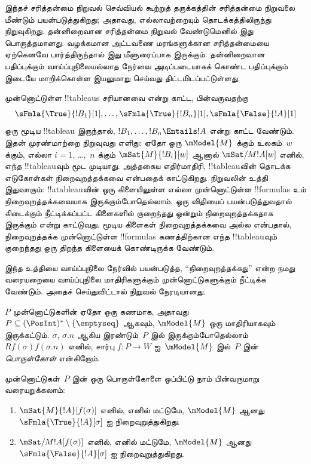 \documentclass[../../../include/open-logic-section]{subfiles}
\begin{document}


\begin{editorial}
  இந்தச் சரித்தன்மை நிறுவல் செவ்வியல் கூற்றுத் தருக்கத்தின் சரித்தன்மை
  நிறுவலை மீண்டும் பயன்படுத்துகிறது; அதாவது, எல்லாவற்றையும் தொடக்கத்திலிருந்து
  நிறுவுகிறது. தன்னிறைவான சரித்தன்மை நிறுவல் வேண்டுமெனில் இது பொருத்தமானது.
  வழக்கமான அட்டவணை மரங்களுக்கான சரித்தன்மையை ஏற்கெனவே பார்த்திருந்தால் இது
  மீளுரைப்பாக இருக்கும். தன்னிறைவான பதிப்புக்கும் வாய்ப்புநிலையல்லாத நேர்வை
  அடிப்படையாகக் கொண்ட பதிப்புக்கும் இடையே மாறிக்கொள்ள இயலுமாறு செய்வது
  திட்டமிடப்பட்டுள்ளது.
\end{editorial}

\begin{explain}
  முன்னொட்டுள்ள !!{tableau}s சரியானவை என்று காட்ட, பின்வருவதற்கு
  \[
  \sFmla{\True}{!B_1}[1], \dots, \sFmla{\True}{!B_n}[1], \sFmla{\False}{!A}[1]
  \]
  ஒரு மூடிய !!{tableau} இருந்தால், $!B_1, \dots, !B_n \Entails !A$
  என்று காட்ட வேண்டும். இதன் முரண்மாற்றை நிறுவுவது எளிது: ஏதோ ஒரு
  $\mModel{M}$ க்கும் உலகம்~$w$ க்கும், எல்லா $i=1$, \dots,~$n$ க்கும்
  $\mSat{M}{!B_i}[w]$ ஆனால்
  $\mSat/{M}{!A}[w]$ எனில், எந்த !!{tableau}வும் மூட முடியாது. அத்தகைய
  எதிர்மாதிரி, !!{tableau}வின் தொடக்க எடுகோள்கள் நிறைவுறத்தக்கவை என்பதைக்
  காட்டுகிறது. நிறுவலின் உத்தி இதுவாகும்: !!a{tableau}வின் ஒரு கிளையிலுள்ள
  எல்லா முன்னொட்டுள்ள !!{formula}s உம் நிறைவுறத்தக்கவையாக இருக்கும்போதெல்லாம்,
  ஒரு விதியைப் பயன்படுத்துவதால் கிடைக்கும் நீட்டிக்கப்பட்ட கிளைகளில்
  குறைந்தது ஒன்றும் நிறைவுறத்தக்கதாக இருக்கும் என்று காட்டுவது. மூடிய கிளைகள்
  நிறைவுறத்தக்கவை அல்ல என்பதால், நிறைவுறத்தக்க முன்னொட்டுள்ள !!{formula}s
  கணத்திற்கான எந்த !!{tableau}வும் குறைந்தது ஒரு திறந்த கிளையைக் கொண்டிருக்க
  வேண்டும்.

  இந்த உத்தியை வாய்ப்புநிலை நேர்வில் பயன்படுத்த, ``நிறைவுறத்தக்கது'' என்ற
  நமது வரையறையை வாய்ப்புநிலை மாதிரிகளுக்கும் முன்னொட்டுகளுக்கும் நீட்டிக்க
  வேண்டும். அதைச் செய்துவிட்டால் நிறுவல் நேரடியானது.
\end{explain}

\begin{defn}
  $P$ முன்னொட்டுகளின் ஏதோ ஒரு கணமாக, அதாவது $P \subseteq (\PosInt)^*
  \setminus \{\emptyseq\}$ ஆகவும், $\mModel{M}$ ஒரு மாதிரியாகவும்
  இருக்கட்டும். $\sigma$, $\sigma.n$ ஆகிய இரண்டும்~$P$ இல்
  இருக்கும்போதெல்லாம் $Rf(\sigma)f(\sigma.n)$ எனில், சார்பு
  $f\colon P \to W$ ஐ~$\mModel{M}$ இல்~$P$ இன்
  \emph{பொருள்கோள்} என்கிறோம்.

  முன்னொட்டுகள்~$P$ இன் ஒரு பொருள்கோளை ஒப்பிட்டு நாம் பின்வருமாறு
  வரையறுக்கலாம்:
  \begin{enumerate}
  \item $\mSat{M}{!A}[f(\sigma)]$ எனில், எனில் மட்டுமே, $\mModel{M}$
    ஆனது $\sFmla{\True}{!A}[\sigma]$ ஐ நிறைவுறுத்துகிறது.
  \item $\mSat/{M}{!A}[f(\sigma)]$ எனில், எனில் மட்டுமே, $\mModel{M}$
    ஆனது $\sFmla{\False}{!A}[\sigma]$ ஐ நிறைவுறுத்துகிறது.
  \end{enumerate}
\end{defn}
\end{document}
